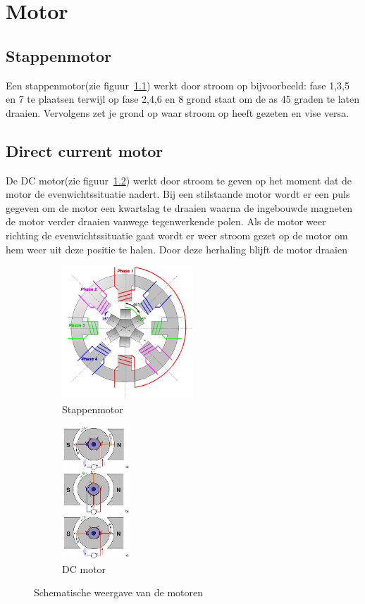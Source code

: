 \chapter{Motor}
\section{Stappenmotor}
Een stappenmotor(zie figuur~\ref{fig:stappenmotor}) werkt door stroom op bijvoorbeeld: fase 1,3,5 en 7 te plaatsen terwijl op fase 2,4,6 en 8 grond staat om de as 45 graden te laten draaien. Vervolgens zet je grond op waar stroom op heeft gezeten en vise versa.

\section{Direct current motor}
De DC motor(zie figuur~\ref{fig:dc_motor}) werkt door stroom te geven op het moment dat de motor de evenwichtssituatie nadert. Bij een stilstaande motor wordt er een puls gegeven om de motor een kwartslag te draaien waarna de ingebouwde magneten de motor verder draaien vanwege tegenwerkende polen. Als de motor weer richting de evenwichtssituatie gaat wordt er weer stroom gezet op de motor om hem weer uit deze positie te halen. Door deze herhaling blijft de motor draaien
\\
\begin{figure}[ht]
\begin{subfigure}{0.6\textwidth}
\includegraphics[height=5cm]{src/stepper_motor_schematic} 
\caption{Stappenmotor}
\label{fig:stappenmotor}
\end{subfigure}
\hfill
\begin{subfigure}{0.4\textwidth}
\includegraphics[height=5cm]{src/dc_motor_schematic}
\caption{DC motor}
\label{fig:dc_motor}
\end{subfigure}
\caption{Schematische weergave van de motoren}
\label{fig:motors}
\end{figure}

